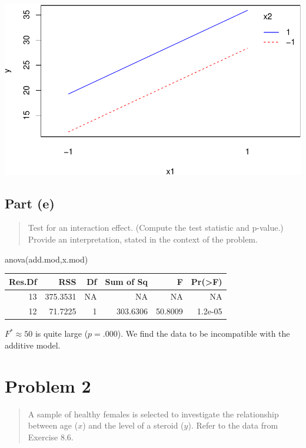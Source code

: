 \documentclass[
]{article}
\newenvironment{Shaded}{\begin{snugshade}}{\end{snugshade}}
\newcommand{\FunctionTok}[1]{\textcolor[rgb]{0.00,0.00,0.00}{#1}}
\newcommand{\NormalTok}[1]{#1}
\begin{document}
\includegraphics{hw9_files/figure-latex/unnamed-chunk-6-1.pdf}

\hypertarget{part-e}{%
\subsection{Part (e)}\label{part-e}}

\begin{quote}
Test for an interaction effect. (Compute the test statistic and
p-value.) Provide an interpretation, stated in the context of the
problem.
\end{quote}

\begin{Shaded}
\begin{Highlighting}[]
\FunctionTok{anova}\NormalTok{(add.mod,x.mod)}
\end{Highlighting}
\end{Shaded}

\begin{longtable}[]{@{}rrrrrr@{}}
\toprule
Res.Df & RSS & Df & Sum of Sq & F & Pr(\textgreater F) \\
\midrule
\endhead
13 & 375.3531 & NA & NA & NA & NA \\
12 & 71.7225 & 1 & 303.6306 & 50.8009 & 1.2e-05 \\
\bottomrule
\end{longtable}

\(F^* \approx 50\) is quite large (\(p = .000\)). We find the data to be
incompatible with the additive model.

\hypertarget{problem-2}{%
\section{Problem 2}\label{problem-2}}

\begin{quote}
A sample of healthy females is selected to investigate the relationship
between age (\(x\)) and the level of a steroid (\(y\)). Refer to the
data from Exercise 8.6.
\end{quote}
\end{document}
